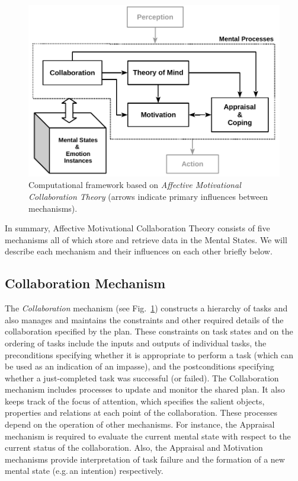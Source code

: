 \begin{figure}[h!]
  \includegraphics[scale=0.78]{figure/theory-general-croped.pdf}
  \caption{Computational framework based on \textit{Affective Motivational
  Collaboration Theory} (arrows indicate primary influences between
  mechanisms).}
  \label{fig:theory}
\end{figure}

In summary, Affective Motivational Collaboration Theory consists of five
mechanisms all of which store and retrieve data in the Mental States. We will
describe each mechanism and their influences on each other briefly below.

\subsection{Collaboration Mechanism}
\label{sec:collaboration-mech}

The \textit{Collaboration} mechanism (see Fig.~\ref{fig:theory}) constructs
a hierarchy of tasks and also manages and maintains the constraints and other
required details of the collaboration specified by the plan. These constraints
on task states and on the ordering of tasks include the inputs and outputs of
individual tasks, the preconditions specifying whether it is appropriate to
perform a task (which can be used as an indication of an impasse), and the
postconditions specifying whether a just-completed task was successful (or
failed). The Collaboration mechanism includes processes to update and monitor
the shared plan. It also keeps track of the focus of attention, which specifies
the salient objects, properties and relations at each point of the
collaboration. These processes depend on the operation of other mechanisms. For
instance, the Appraisal mechanism is required to evaluate the current mental
state with respect to the current status of the collaboration. Also, the
Appraisal and Motivation mechanisms provide interpretation of task failure and
the formation of a new mental state (e.g.\,an intention) respectively.

